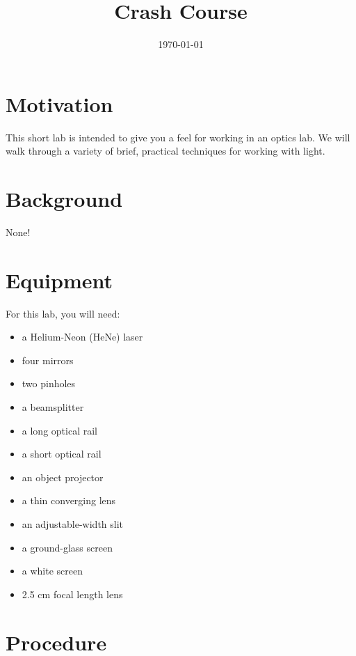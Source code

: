 \documentclass[]{manual}
\title{Crash Course}
\date{\today}
\begin{document}
    \maketitle
    \thispagestyle{firstpage}


    \section*{Motivation}

    This short lab is intended to give you a feel for working in an optics lab.
    We will walk through a variety of brief, practical techniques for working with light.

    \section*{Background}

    None!

    \section*{Equipment}

    For this lab, you will need:
    \begin{itemize}
        \item a Helium-Neon (HeNe) laser
        \item four mirrors
        \item two pinholes
        \item a beamsplitter
        \item a long optical rail
        \item a short optical rail
        \item an object projector
        \item a thin converging lens
        \item an adjustable-width slit
        \item a ground-glass screen
        \item a white screen
        \item 2.5 cm focal length lens
    \end{itemize}

    \FloatBarrier
    \newpage

    \section*{Procedure}
\end{document}
